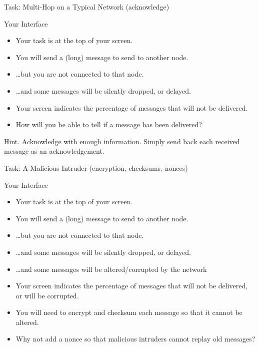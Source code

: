 \documentclass[svgnames]{beamer}
\begin{document}
\begin{frame}{Task: Multi-Hop on a Typical Network (acknowledge)}
\begin{block}{Your Interface}
\begin{itemize}
\item Your task is at the top of your screen.
\item You will send a (long) message to send to another node.
\item \dots but you are not connected to that node.
\item \dots and some messages will be \alert{silently} dropped, or delayed.
\item Your screen indicates the percentage of messages that will not be delivered.
\item How will you be able to tell if a message has been delivered?
\end{itemize}
\end{block}
\pause
\begin{alertblock}{Hint. Acknowledge with enough information.}
{Simply send back each received message as an acknowledgement.}
\end{alertblock}

\end{frame}
\begin{frame}{Task: A Malicious Intruder (encryption, checksums, nonces)}
\begin{block}{Your Interface}
\begin{itemize}
\item Your task is at the top of your screen.
\item You will send a (long) message to send to another node.
\item \dots but you are not connected to that node.
\item \dots and some messages will be \alert{silently} dropped, or delayed.
\item \dots and some messages will be \alert{altered/corrupted by the network}
\item Your screen indicates the percentage of messages that will not be delivered, or will be corrupted.
\item You will need to \alert{encrypt} and \alert{checksum} each message so that it cannot be altered.
\item Why not add a \alert{nonce} so that malicious intruders cannot replay old messages?
\end{itemize}
\end{block}
\end{frame}
\end{document}

